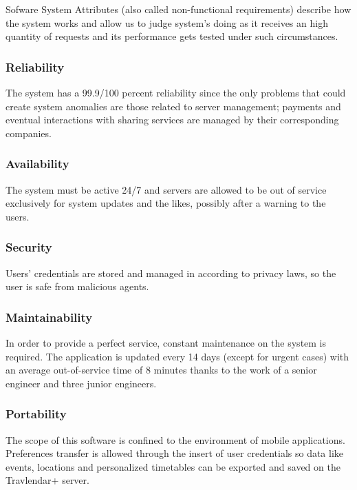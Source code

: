 Sofware System Attributes (also called non-functional requirements) describe how the system works and allow us to judge system's doing as it receives an high quantity of requests and its performance gets tested under such circumstances.

\subsubsection{Reliability}
The system has a 99.9/100 percent reliability since the only problems that could create system anomalies are those related to server management; payments and eventual interactions with sharing services are managed by their corresponding companies.

\subsubsection{Availability}
The system must be active 24/7 and servers are allowed to be out of service exclusively for system updates and the likes, possibly after a  warning to the users.

\subsubsection{Security}
Users' credentials are stored and managed in according to privacy laws, so the user is safe from malicious agents.

\subsubsection{Maintainability}
In order to provide a perfect service, constant maintenance on the system is required. The application is updated every 14 days (except for urgent cases) with an average out-of-service time of 8 minutes thanks to the work of a senior engineer and three junior engineers.

\subsubsection{Portability}
The scope of this software is confined to the environment of mobile applications. Preferences transfer is allowed through the insert of user credentials so data like events, locations and personalized timetables can be exported and saved on the Travlendar+ server.
